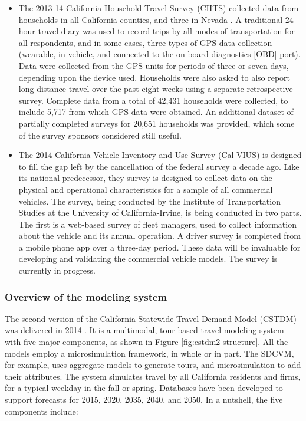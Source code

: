\begin{itemize}
\item
The 2013-14 California Household Travel Survey (CHTS) collected data from households in all California counties, and three in Nevada \citep{nustats13}. A traditional 24-hour travel diary was used to record trips by all modes of transportation for all respondents, and in some cases, three types of GPS data collection (wearable, in-vehicle, and connected to the on-board diagnostics {[}OBD{]} port). Data were collected from the GPS units for periods of three or seven days, depending upon the device used. Households were also asked to also report long-distance travel over the past eight weeks using a separate retrospective survey. Complete data from a total of 42,431 households were collected, to include 5,717 from which GPS data were obtained. An additional dataset of partially completed surveys for 20,651 households was provided, which some of the survey sponsors considered still useful.
\item
The 2014 California Vehicle Inventory and Use Survey (Cal-VIUS) is designed to fill the gap left by the cancellation of the federal survey a decade ago. Like its national predecessor, they survey is designed to collect data on the physical and operational characteristics for a sample of all commercial vehicles. The survey, being conducted by the Institute of Transportation Studies at the University of California-Irvine, is being conducted in two parts. The first is a web-based survey of fleet managers, used to collect information about the vehicle and its annual operation. A driver survey is completed from a mobile phone app over a three-day period. These data will be invaluable for developing and validating the commercial vehicle models. The survey is currently in progress.
\end{itemize}

\subsubsection{Overview of the modeling system}

The second version of the California Statewide Travel Demand Model (CSTDM) was delivered in 2014 \citep{cambridge14-cstdm}. It is a multimodal, tour-based travel modeling system with five major components, as shown in Figure \ref{fig:cstdm2-structure}. All the models employ a microsimulation framework, in whole or in part. The SDCVM, for example, uses aggregate models to generate tours, and microsimulation to add their attributes. The system simulates travel by all California residents and firms, for a typical weekday in the fall or spring. Databases have been developed to support forecasts for 2015, 2020, 2035, 2040, and 2050. In a nutshell, the five components include:

